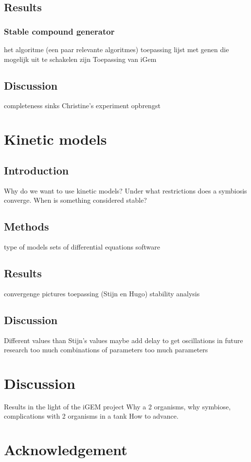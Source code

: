 \documentclass[10pt]{report}
\begin{document}
\section{Results}
\subsection{Stable compound generator}
het algoritme (een paar relevante algoritmes)
toepassing lijst met genen die mogelijk uit te schakelen zijn
Toepassing van iGem

\section{Discussion}
completeness
sinks
Christine's experiment
opbrengst

\chapter{Kinetic models}

\begin{abstract}
  
\end{abstract}

\section{Introduction}
Why do we want to use kinetic models?
Under what restrictions does a symbiosis converge.
When is something considered stable?

\section{Methods}
type of models
sets of differential equations
software

\section{Results}
convergenge
pictures
toepassing (Stijn en Hugo)
stability analysis

\section{Discussion}
Different values than Stijn's values
maybe add delay to get oscillations in future research
too much combinations of parameters
too much parameters

\chapter{Discussion}
Results in the light of the iGEM project
Why a 2 organisms, why symbiose, complications with 2 organisms in a tank
How to advance.


\chapter{Acknowledgement}
\end{document}
